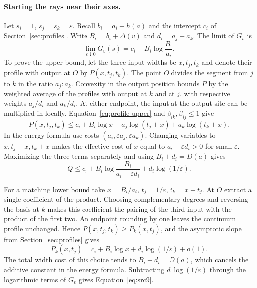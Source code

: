 \paragraph{Starting the rays near their axes.}
Let $s_i=1$, $s_j=s_k=\varepsilon$. Recall $b_i=a_i-h(a)$ and the
intercept $c_i$ of Section~\ref{sec:profiles}. Write
$B_i=b_i+\Delta(v)$ and $d_i=a_j+a_k$. The limit of $G_v$ is
\begin{equation}\label{eq:src9}
           \lim_{\varepsilon\downarrow0}G_v(s)
                =c_i+B_i\log\frac{B_i}{a_i}.
\end{equation}
To prove the upper bound, let the three input widths be $x,t_j,t_k$
and denote their profile with output at $O$ by $P(x,t_j,t_k)$.
The point $O$ divides the segment from $j$ to $k$ in the ratio
$a_j:a_k$. Convexity in the output position bounds $P$ by the
weighted average of the profiles with output at $k$ and at $j$,
with respective weights $a_j/d_i$ and $a_k/d_i$. At either
endpoint, the input at the output site can be multiplied in
locally. Equation~\eqref{eq:profile-upper} and
$\beta_{ik},\beta_{ij}\le1$ give
\[
 P(x,t_j,t_k)\le c_i+B_i\log x
                +a_j\log(t_j+x)+a_k\log(t_k+x).
\]
In the energy formula use costs $(a_i,\varepsilon a_j,\varepsilon a_k)$.
Changing variables to $x,t_j+x,t_k+x$ makes the effective cost of
$x$ equal to $a_i-\varepsilon d_i>0$ for small $\varepsilon$.
Maximizing the three terms separately and using $B_i+d_i=D(a)$
gives
\[
 Q\le c_i+B_i\log\frac{B_i}{a_i-\varepsilon d_i}
                  +d_i\log(1/\varepsilon).
\]

For a matching lower bound take $x=B_i/a_i$, $t_j=1/\varepsilon$,
$t_k=x+t_j$. At $O$ extract a single coefficient of the product.
Choosing complementary degrees and reversing the basis at $k$ makes
this coefficient the pairing of the third input with the product
of the first two. An endpoint rounding by one leaves the continuum
profile unchanged. Hence $P(x,t_j,t_k)\ge P_k(x,t_j)$, and the
asymptotic slope from Section~\ref{sec:profiles} gives
\[
       P_k(x,t_j)=c_i+B_i\log x+d_i\log(1/\varepsilon)+o(1).
\]
The total width cost of this choice tends to $B_i+d_i=D(a)$, which
cancels the additive constant in the energy formula. Subtracting
$d_i\log(1/\varepsilon)$ through the logarithmic terms of $G_v$
gives Equation~\eqref{eq:src9}.

